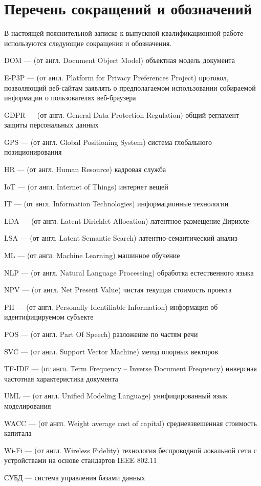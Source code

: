 \documentclass[../main]{subfiles}
\begin{document}
\newpage
{}
{}
\section*{Перечень сокращений и обозначений}

В настоящей пояснительной записке к выпускной квалификационной
работе используются следующие сокращения и обозначения.

\begin{termenum}
    \item DOM --- (от англ. Document Object Model) объектная модель документа
    \item E-P3P --- (от англ. Platform for Privacy Preferences Project) протокол, позволяющий веб-сайтам заявлять о предполагаемом использовании собираемой информации о пользователях веб-браузера
    \item GDPR --- (от англ. General Data Protection Regulation) общий регламент защиты персональных данных
    \item GPS --- (от англ. Global Positioning System) система глобального позиционирования
    \item HR --- (от англ. Human Resource) кадровая служба
    \item IoT --- (от англ. Internet of Things) интернет вещей
    \item IT --- (от англ. Information Technologies) информационные технологии
    \item LDA --- (от англ. Latent Dirichlet Allocation) латентное размещение Дирихле
    \item LSA --- (от англ. Latent Semantic Search) латентно-семантический анализ
    \item ML --- (от англ. Machine Learning) машинное обучение
    \item NLP --- (от англ. Natural Language Processing) обработка естественного языка
    \item NPV --- (от англ. Net Present Value) чистая текущая стоимость проекта
    \item PII --- (от англ. Personally Identifiable Information) информация об идентифицируемом субъекте
    \item POS --- (от англ. Part Of Speech) разложение по частям речи
    \item SVC --- (от англ. Support Vector Machine) метод опорных векторов
    \item TF-IDF --- (от англ. Term Frequency -- Inverse Document Frequency) инверсная частотная характеристика документа
    \item UML --- (от англ. Unified Modeling Language) унифицированный язык моделирования
    \item WACC --- (от англ. Weight average cost of capital) средневзвешенная стоимость капитала
    \item Wi-Fi --- (от англ. Wireless Fidelity) технология беспроводной локальной сети с устройствами на основе стандартов IEEE 802.11
    \item СУБД --- система управления базами данных
\end{termenum}
\end{document}
